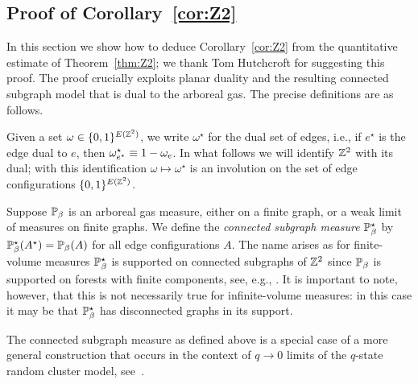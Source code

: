 \documentclass[11pt]{amsart}
\numberwithin{equation}{section}
\numberwithin{theorem}{section}
\begin{document}
\subsection{Proof of  Corollary~\ref{cor:Z2}}
\label{sec:Z2qual}
In this section we show how to deduce Corollary~\ref{cor:Z2} from the
quantitative estimate of
Theorem~\ref{thm:Z2}; 
we thank Tom Hutchcroft for suggesting this proof. The proof crucially
exploits planar duality and the resulting connected subgraph model
that is dual to the arboreal gas. The precise definitions are as
follows.

Given a set $\omega\in \{0,1\}^{E(\Z^{2})}$, we write $\omega^{\star}$
for the dual set of edges, i.e., if
$e^{\star}$ is the edge dual to $e$, then
$\omega^{\star}_{e^{\star}}\bydef 1-\omega_{e}$. In what
follows we will identify $\Z^{2}$ with its dual; with this
identification $\omega\mapsto \omega^{\star}$ is an involution on the
set of edge configurations $\{0,1\}^{E(\Z^{2})}$.

Suppose $\P_{\beta}$ is an arboreal gas measure, either on a
finite graph, or a weak limit of measures on finite graphs.
We define the \emph{connected subgraph measure} $\P_{\beta}^{\star}$ by
$\P_{\beta}^{\star}(A^{\star}) = \P_{\beta}(A)$ for all edge
configurations $A$. The name arises as for finite-volume measures
$\P_{\beta}^{\star}$ is supported on connected subgraphs of $\Z^{2}$
since $\P_{\beta}$ is supported on forests with finite components,
see, e.g., \cite[Theorem~2.1]{MR2060630}. It is important to note,
however, that this is not necessarily true for infinite-volume
measures: in this case it may be that $\P_{\beta}^{\star}$ has
disconnected graphs in its support.

\begin{remark}
  \label{rem:CSM}
  The connected subgraph measure as defined above is a special case of
  a more general construction that occurs in the context of $q\to 0$
  limits of the $q$-state random cluster model,
  see~\cite{MR2060630}.
\end{remark}
\end{document}
